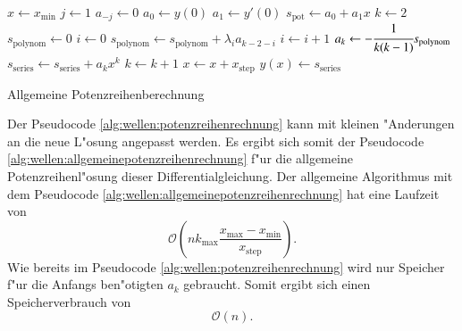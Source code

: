 \begin{algorithm}
	\begin{algorithmic}[1]
		\State $x \gets x_{\text{min}}$
			\State $j \gets 1$
				\State $a_{-j} \gets 0$
			\EndFor
			\State $a_0 \gets y(0)$
			\State $a_1 \gets y'(0)$
			\State $s_{\text{pot}} \gets a_0 + a_1x$
			\State $k \gets 2$
				\State $s_{\text{polynom}} \gets 0$
				\State $i \gets 0$
					\State $s_{\text{polynom}} \gets 
					s_{\text{polynom}}+\lambda_i a_{k-2-i}$
					\State $i \gets i + 1$
				\EndFor
				\State $a_k \gets -\cfrac{1}{k(k-1)} s_{\text{polynom}}$
				\State $s_{\text{series}} \gets s_{\text{series}} + 
				a_k x^k$
				\State $k \gets k + 1$
			\EndFor
		\State $x \gets x + x_{\text{step}}$
		\State $y(x) \gets s_{\text{series}}$
		\EndFor
	\end{algorithmic}
	
	\caption{Allgemeine Potenzreihenberechnung} 
	\label{alg:wellen:allgemeinepotenzreihenrechnung}
\end{algorithm}

Der Pseudocode \ref{alg:wellen:potenzreihenrechnung} kann mit kleinen 
"Anderungen an die neue L"osung angepasst werden. Es ergibt sich somit der 
Pseudocode \ref{alg:wellen:allgemeinepotenzreihenrechnung} f"ur die allgemeine 
Potenzreihenl"osung dieser Differentialgleichung. Der allgemeine Algorithmus 
mit dem Pseudocode \ref{alg:wellen:allgemeinepotenzreihenrechnung} hat eine 
Laufzeit von
\begin{equation*}
	\mathcal{O}
	\left(
		nk_{\text{max}}\frac{x_{\text{max}}-x_{\text{min}}}{x_{\text{step}}}
	\right).
\end{equation*}
Wie bereits im Pseudocode \ref{alg:wellen:potenzreihenrechnung} wird nur 
Speicher f"ur die Anfangs ben"otigten $a_k$ gebraucht. Somit ergibt sich einen 
Speicherverbrauch von
\begin{equation*}
	\mathcal{O}
	\left(
		n
	\right).
\end{equation*}